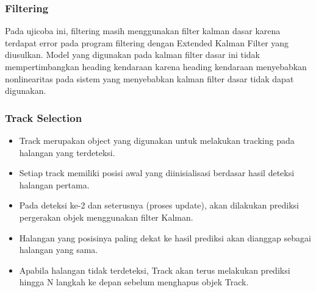 \begin{frame}
    \frametitle{Filtering}

    Pada ujicoba ini, filtering masih menggunakan filter kalman dasar karena terdapat error pada program filtering dengan Extended Kalman Filter yang diusulkan. Model yang digunakan pada kalman filter dasar ini tidak mempertimbangkan heading kendaraan karena heading kendaraan menyebabkan nonlinearitas pada sistem yang menyebabkan kalman filter dasar tidak dapat digunakan.
\end{frame}


\begin{frame}
    \frametitle{Track Selection}

    \begin{itemize}
        \item Track merupakan object yang digunakan untuk melakukan tracking pada halangan yang terdeteksi. 
        \item Setiap track memiliki posisi awal yang diinisialisasi berdasar hasil deteksi halangan pertama. 
        \item Pada deteksi ke-2 dan seterusnya (proses update), akan dilakukan prediksi pergerakan objek menggunakan filter Kalman. 
        \item Halangan yang posisinya paling dekat ke hasil prediksi akan dianggap sebagai halangan yang sama. 
        \item Apabila halangan tidak terdeteksi, Track akan terus melakukan prediksi hingga N langkah ke depan sebelum menghapus objek Track.
    \end{itemize}
\end{frame}


\begin{frame}
    \centering
\end{frame}